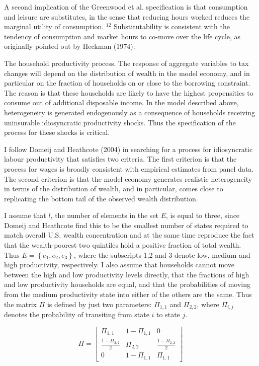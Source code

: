 \documentclass[11pt]{article}
\begin{document}
A second implication of the Greenwood et al. specification is that consumption and leisure are substitutes, in the sense that reducing hours worked reduces the marginal utility of consumption. ${ }^{12}$ Substitutability is consistent with the tendency of consumption and market hours to co-move over the life cycle, as originally pointed out by Heckman (1974).

The household productivity process. The response of aggregate variables to tax changes will depend on the distribution of wealth in the model economy, and in particular on the fraction of households on or close to the borrowing constraint. The reason is that these households are likely to have the highest propensities to consume out of additional disposable income. In the model described above, heterogeneity is generated endogenously as a consequence of households receiving uninsurable idiosyncratic productivity shocks. Thus the specification of the process for these shocks is critical.

I follow Domeij and Heathcote (2004) in searching for a process for idiosyncratic labour productivity that satisfies two criteria. The first criterion is that the process for wages is broadly consistent with empirical estimates from panel data. The second criterion is that the model economy generates realistic heterogeneity in terms of the distribution of wealth, and in particular, comes close to replicating the bottom tail of the observed wealth distribution.

I assume that $l$, the number of elements in the set $E$, is equal to three, since Domeij and Heathcote find this to be the smallest number of states required to match overall U.S. wealth concentration and at the same time reproduce the fact that the wealth-poorest two quintiles hold a positive fraction of total wealth. Thus $E=\left\{e_{1}, e_{2}, e_{3}\right\}$, where the subscripts 1,2 and 3 denote low, medium and high productivity, respectively. I also assume that households cannot move between the high and low productivity levels directly, that the fractions of high and low productivity households are equal, and that the probabilities of moving from the medium productivity state into either of the others are the same. Thus the matrix $\Pi$ is defined by just two parameters: $\Pi_{1,1}$ and $\Pi_{2,2}$, where $\Pi_{i, j}$ denotes the probability of transiting from state $i$ to state $j$.

\[
\Pi=\left[\begin{array}{ccc}
\Pi_{1,1} & 1-\Pi_{1,1} & 0  \tag{3.16}\\
\frac{1-\Pi_{2,2}}{2} & \Pi_{2,2} & \frac{1-\Pi_{2,2}}{2} \\
0 & 1-\Pi_{1,1} & \Pi_{1,1}
\end{array}\right]
\]
\end{document}
